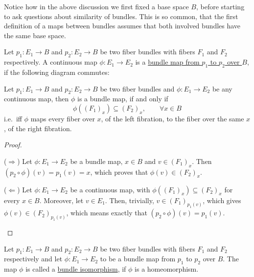 Notice how in the above discussion we first fixed a base space $B$, before starting to ask questions about similarity of bundles. This is so common, that the first definition of a maps between bundles assumes that both involved bundles have the same base space.
\begin{definition}
Let $p_1:E_1\to B$ and $p_2:E_2\to B$ be two fiber bundles with fibers $F_1$ and $F_2$ respectively. A continuous map $\phi:E_1\to E_2$ is a \ul{bundle map from $p_1$ to $p_2$ over $B$}, if the following diagram commutes:
\begin{center}
\end{center}
\end{definition}

\begin{proposition}
Let $p_1:E_1\to B$ and $p_2:E_2\to B$ be two fiber bundles and $\phi:E_1\to E_2$ be any continuous map, then $\phi$ is a bundle map, if and only if
\[\phi\left({(F_1)}_x\right)\subseteq{(F_2)}_x,\qquad\forall x\in B\]
i.e.\ iff $\phi$ maps every fiber over $x$, of the left fibration, to the fiber over the same $x$, of the right fibration.
\end{proposition}
\begin{proof}
\begin{b_item}
\item[($\Rightarrow$)] Let $\phi:E_1\to E_2$ be a bundle map, $x\in B$ and $v\in {(F_1)}_x$. Then $(p_2\circ\phi)(v)=p_1(v)=x$, which proves that $\phi(v)\in{(F_2)}_x$.
\item[($\Leftarrow$)] Let $\phi:E_1\to E_2$ be a continuous map, with $\phi\left({(F_1)}_x\right)\subseteq{(F_2)}_x$ for every $x\in B$. Moreover, let $v\in E_1$. Then, trivially, $v\in {(F_1)}_{p_1(v)}$, which gives $\phi(v)\in {(F_2)}_{p_1(v)}$, which means exactly that $(p_2\circ\phi)(v)=p_1(v)$.\qedhere
\end{b_item}
\end{proof}

\begin{definition}
Let $p_1:E_1\to B$ and $p_2:E_2\to B$ be two fiber bundles with fibers $F_1$ and $F_2$ respectively and let $\phi:E_1\to E_2$ to be a bundle map from $p_1$ to $p_2$ over $B$. The map $\phi$ is called a \ul{bundle isomorphism}, if $\phi$ is a homeomorphism.
\end{definition}

